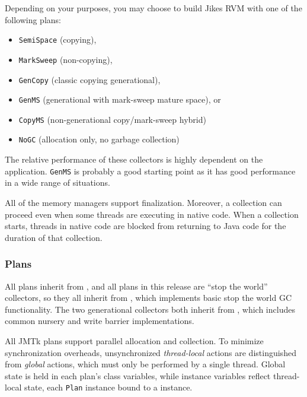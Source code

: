 Depending on your purposes, you may choose to build Jikes RVM with one
of the following plans:
\begin{itemize}
\item \texttt{SemiSpace} (copying),
\item \texttt{MarkSweep} (non-copying),
\item \texttt{GenCopy} (classic copying generational),
\item \texttt{GenMS} (generational with mark-sweep mature space), or
\item \texttt{CopyMS} (non-generational copy/mark-sweep hybrid)
\item \texttt{NoGC} (allocation only, no garbage collection)
\end{itemize}
The relative performance of these collectors is highly dependent on
the application.  \texttt{GenMS} is probably a good starting point as
it has good performance in a wide range of situations.

All of the memory managers support finalization.  Moreover, a
collection can proceed even when some threads are executing in native
code. When a collection starts, threads in native code are blocked
from returning to Java code for the duration of that collection.

\subsubsection{Plans} \label{sssec:plans}

All plans inherit from ,
and all plans in this release are ``stop the world'' collectors, so
they all inherit from
, which implements
basic stop the world GC functionality.  The two generational
collectors both inherit from
, which includes
common nursery and write barrier implementations.

All JMTk plans support parallel allocation and collection.  To
minimize synchronization overheads, unsynchronized \emph{thread-local}
actions are distinguished from \emph{global} actions, which must only
be performed by a single thread.  Global state is held in each plan's
class variables, while instance variables reflect thread-local state,
each \texttt{Plan} instance bound to a
 instance.

